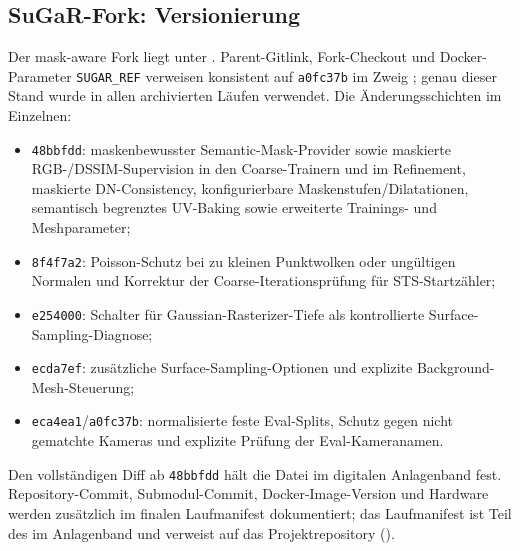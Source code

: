 \subsection*{SuGaR-Fork: Versionierung}

Der mask-aware Fork liegt unter . Parent-Gitlink,
Fork-Checkout und Docker-Parameter \texttt{SUGAR\_REF} verweisen konsistent
auf \texttt{a0fc37b} im Zweig ; genau dieser
Stand wurde in allen archivierten Läufen verwendet. Die Änderungsschichten im
Einzelnen:

\begin{itemize}
  \item \texttt{48bbfdd}: maskenbewusster Semantic-Mask-Provider sowie
    maskierte RGB-/DSSIM-Supervision in den Coarse-Trainern und im Refinement,
    maskierte DN-Consistency, konfigurierbare Maskenstufen/Dilatationen,
    semantisch begrenztes UV-Baking sowie erweiterte Trainings- und
    Meshparameter;
  \item \texttt{8f4f7a2}: Poisson-Schutz bei zu kleinen Punktwolken oder
    ungültigen Normalen und Korrektur der Coarse-Iterationsprüfung für
    STS-Startzähler;
  \item \texttt{e254000}: Schalter für Gaussian-Rasterizer-Tiefe als
    kontrollierte Surface-Sampling-Diagnose;
  \item \texttt{ecda7ef}: zusätzliche Surface-Sampling-Optionen und explizite
    Background-Mesh-Steuerung;
  \item \texttt{eca4ea1}/\texttt{a0fc37b}: normalisierte feste Eval-Splits,
    Schutz gegen nicht gematchte Kameras und explizite Prüfung der
    Eval-Kameranamen.
\end{itemize}

Den vollständigen Diff ab \texttt{48bbfdd} hält die Datei
 im digitalen Anlagenband fest.
Repository-Commit, Submodul-Commit, Docker-Image-Version und Hardware werden
zusätzlich im finalen Laufmanifest dokumentiert; das Laufmanifest ist Teil des
 im Anlagenband und verweist auf das Projektrepository
(\parencite{scan2bimImplementation}).
